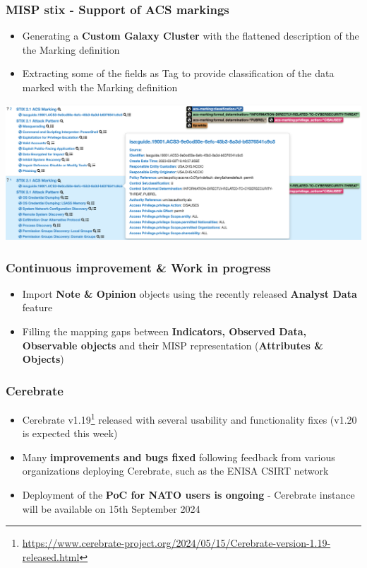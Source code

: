 \begin{frame}
     \frametitle{MISP stix - Support of ACS markings}
     \begin{itemize}
	     \item Generating a {\bf Custom Galaxy Cluster} with the flattened description of the the Marking definition
             \item Extracting some of the fields as Tag to provide classification of the data marked with the Marking definition
     \end{itemize}
	\begin{center}
	    \includegraphics[scale=0.4]{stix-cluster5.png}
        \end{center}
\end{frame}

\begin{frame}
       \frametitle{Continuous improvement \& Work in progress}
	\begin{itemize}
		\item Import {\bf Note \& Opinion} objects using the recently released {\bf Analyst Data} feature
		\item Filling the mapping gaps between {\bf Indicators, Observed Data, Observable objects} and their MISP representation ({\bf Attributes \& Objects})
	\end{itemize}
\end{frame}

\begin{frame}
    \frametitle{Cerebrate}
    \begin{itemize}
        \item Cerebrate v1.19\footnote{\url{https://www.cerebrate-project.org/2024/05/15/Cerebrate-version-1.19-released.html}} released with several usability and functionality fixes (v1.20 is expected this week)
        \item Many \textbf{improvements and bugs fixed} following feedback from various organizations deploying Cerebrate, such as the ENISA CSIRT network
        \item Deployment of the \textbf{PoC for NATO users is ongoing} - Cerebrate instance will be available on 15th September 2024
    \end{itemize}
\end{frame}

